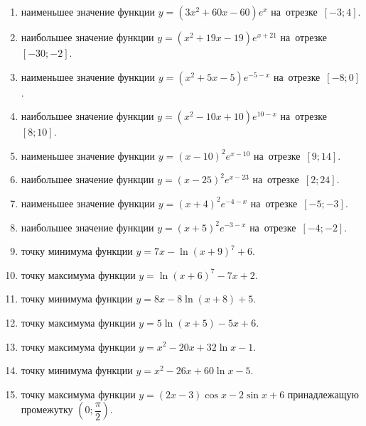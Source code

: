 \documentclass[a4paper,10pt]{article}
\begin{document}
\begin{enumerate}
\item {} наименьшее значение функции $y=\left(3x^2 +60x -60\right)e^{x }$ на~отрезке~$\left[-3;4\right]$.

\item {} наибольшее значение функции $y=\left(x^2 +19x -19\right)e^{x+21}$ на~отрезке~$\left[-30;-2\right]$.

\item {} наименьшее значение функции $y=\left(x^2 +5x -5\right)e^{-5-x}$ на~отрезке~$\left[-8;0\right]$.

\item {} наибольшее значение функции $y=\left(x^2 -10x +10\right)e^{10-x}$ на~отрезке~$\left[8;10\right]$.

\item {} наименьшее значение функции $y=\left(x-10\right)^2e^{x-10}$ на~отрезке~$\left[9;14\right]$.

\item {} наибольшее значение функции $y=\left(x-25\right)^2e^{x-23}$ на~отрезке~$\left[2;24\right]$.

\item {} наименьшее значение функции $y=\left(x+4\right)^2e^{-4-x}$ на~отрезке~$\left[-5;-3\right]$.

\item {} наибольшее значение функции $y=\left(x+5\right)^2e^{-3-x}$ на~отрезке~$\left[-4;-2\right]$.

\item {} точку минимума функции $y=7x-\ln\left(x+9\right)^{7}+6$.

\item {} точку максимума функции $y=\ln\left(x+6\right)^{7}-7x+2$.

\item {} точку минимума функции $y=8x-8\ln\left(x+8\right)+5$.

\item {} точку максимума функции $y=5\ln\left(x+5\right)-5x+6$.

\item {} точку максимума функции $y=x^2-20x+32\ln x -1$.

\item {} точку минимума функции $y=x^2-26x+60\ln x -5$.

\item {} точку максимума функции $y=\left(2x-3\right)\cos x -2\sin x+6$
принадлежащую промежутку $\left(0;\dfrac{\pi}{2}\right)$.


\end{enumerate}
\end{document}
